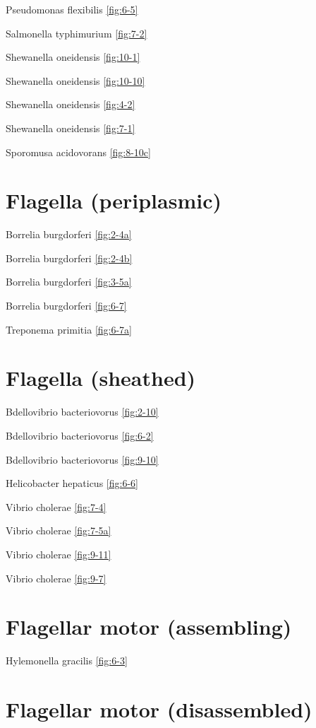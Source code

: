 \documentclass[]{tufte-book}
\begin{document}
Pseudomonas flexibilis \ref{fig:6-5}

Salmonella typhimurium \ref{fig:7-2}

Shewanella oneidensis \ref{fig:10-1}

Shewanella oneidensis \ref{fig:10-10}

Shewanella oneidensis \ref{fig:4-2}

Shewanella oneidensis \ref{fig:7-1}

Sporomusa acidovorans \ref{fig:8-10c}

\section*{Flagella (periplasmic)}\label{flagella-periplasmic}

Borrelia burgdorferi \ref{fig:2-4a}

Borrelia burgdorferi \ref{fig:2-4b}

Borrelia burgdorferi \ref{fig:3-5a}

Borrelia burgdorferi \ref{fig:6-7}

Treponema primitia \ref{fig:6-7a}

\section*{Flagella (sheathed)}\label{flagella-sheathed}

Bdellovibrio bacteriovorus \ref{fig:2-10}

Bdellovibrio bacteriovorus \ref{fig:6-2}

Bdellovibrio bacteriovorus \ref{fig:9-10}

Helicobacter hepaticus \ref{fig:6-6}

Vibrio cholerae \ref{fig:7-4}

Vibrio cholerae \ref{fig:7-5a}

Vibrio cholerae \ref{fig:9-11}

Vibrio cholerae \ref{fig:9-7}

\section*{Flagellar motor
(assembling)}\label{flagellar-motor-assembling}

Hylemonella gracilis \ref{fig:6-3}

\section*{Flagellar motor
(disassembled)}\label{flagellar-motor-disassembled}
\end{document}

